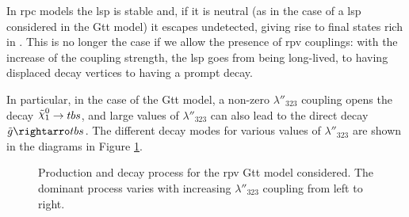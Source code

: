 In \gls{rpc} models the \gls{lsp} is stable and, if it is neutral (as in the case of a \ninoone \gls{lsp} 
considered in the Gtt model) it escapes undetected, giving rise to final states rich in \met. 
This is no longer the case if we allow the presence of \gls{rpv} couplings: with the increase of the 
coupling strength, the \gls{lsp} goes from being long-lived, to having displaced decay vertices to 
having a prompt decay. 

In particular, in the case of the Gtt model, a non-zero $\lambda''_{323}$ coupling opens the decay 
$\ninoone \rightarrow t b s$, and large values  of $\lambda''_{323}$ can also lead to the 
direct decay $\tilde{g} \rightarro t b s$. The different decay modes for various values of  
$\lambda''_{323}$ are shown in the diagrams in Figure \ref{fig:rpcrpv_diagrams}.
 

\begin{figure}[htbp]
	\centering 
	\caption{Production and decay process for the \gls{rpv} Gtt model considered.
	 The dominant process varies with increasing $\lambda''_{323}$ coupling from left to right.}
	\label{fig:rpcrpv_diagrams}
\end{figure}

